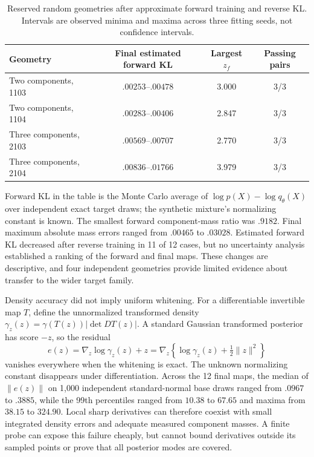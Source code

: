 \begin{table}[htbp]
\centering
\caption{Reserved random geometries after approximate forward training and
reverse KL. Intervals are observed minima and maxima across three fitting
seeds, not confidence intervals.}
\label{tab:neutra-forward-reverse-random}
\begin{tabular}{lccc}
\toprule
Geometry & Final estimated forward KL & Largest $z_f$ & Passing pairs\\
\midrule
Two components, 1103 & $.00253$--$.00478$ & 3.000 & 3/3\\
Two components, 1104 & $.00283$--$.00406$ & 2.847 & 3/3\\
Three components, 2103 & $.00569$--$.00707$ & 2.770 & 3/3\\
Three components, 2104 & $.00836$--$.01766$ & 3.979 & 3/3\\
\bottomrule
\end{tabular}
\end{table}

Forward KL in the table is the Monte Carlo average of $\log p(X)-\log
q_\theta(X)$ over independent exact target draws; the synthetic mixture's
normalizing constant is known. The smallest forward component-mass ratio was
$.9182$. Final maximum absolute mass errors ranged from $.00465$ to $.03028$.
Estimated forward KL decreased after reverse training in 11 of 12 cases, but
no uncertainty analysis established a ranking of the forward and final maps.
These changes are descriptive, and four independent geometries provide
limited evidence about transfer to the wider target family.

Density accuracy did not imply uniform whitening. For a differentiable
invertible map $T$, define the unnormalized transformed density
$\gamma_z(z)=\gamma(T(z))|\det DT(z)|$. A standard Gaussian transformed
posterior has score $-z$, so the residual
\begin{equation}
 e(z)=\nabla_z\log\gamma_z(z)+z
      =\nabla_z\left\{\log\gamma_z(z)+\tfrac12\|z\|^2\right\}
\end{equation}
vanishes everywhere when the whitening is exact. The unknown normalizing
constant disappears under differentiation. Across the 12 final maps, the
median of $\|e(z)\|$ on 1,000 independent standard-normal base draws ranged
from $.0967$ to $.3885$, while the 99th percentiles ranged from $10.38$ to
$67.65$ and maxima from $38.15$ to $324.90$. Local sharp derivatives can
therefore coexist with small integrated density errors and adequate measured
component masses. A finite probe can expose this failure cheaply, but cannot
bound derivatives outside its sampled points or prove that all posterior modes
are covered.

